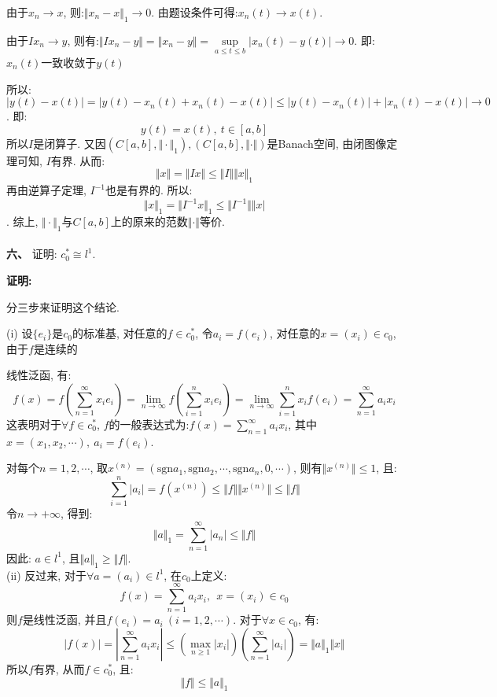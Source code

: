 \documentclass{article}
\begin{document}
由于$x_n \rightarrow x$, 则:$\Vert x_n - x \Vert_1 \rightarrow 0$. 由题设条件可得:$x_n(t) \rightarrow x(t)$. 

由于$Ix_n \rightarrow y$, 则有:$\Vert Ix_n - y \Vert = \Vert x_n - y \Vert = \sup\limits_{a \leq t \leq b} |x_n(t) - y(t)| \rightarrow 0$. 即:$x_n(t)$一致收敛于$y(t)$

所以:$|y(t) - x(t)| = |y(t) - x_n(t) + x_n(t) - x(t)| \leq |y(t) - x_n(t)| + |x_n(t) - x(t)| \rightarrow 0$. 即: 
$$y(t) = x(t), \ t \in [a,b]$$
所以$I$是闭算子. 又因$(C[a,b], \Vert \cdot \Vert_1), (C[a,b], \Vert \cdot \Vert)$是Banach空间, 由闭图像定理可知, $I$有界. 从而:
$$ \Vert x \Vert = \Vert Ix \Vert \leq \Vert I \Vert \Vert x \Vert_1 $$
再由逆算子定理, $I^{-1}$也是有界的. 所以:
$$ \Vert x \Vert_1 = \Vert I^{-1}x \Vert_1 \leq \Vert I^{-1} \Vert \Vert x \vert $$ .
综上, $\Vert \cdot \Vert_1$与$C[a,b]$上的原来的范数$\Vert \cdot \Vert$等价. \\  \\



\textbf{六、} 证明: $c_0^* \cong l^1$.

\textbf{证明:}

分三步来证明这个结论.

(i) 设$\{e_i \}$是$c_0$的标准基, 对任意的$f \in c_0^*$, 令$a_i = f(e_i)$, 对任意的$x=(x_i) \in c_0$, 由于$f$是连续的

\hspace{1.1em} 线性泛函, 有:
$$ f(x) = f(\sum\limits_{n=1}^{\infty} x_ie_i) = \lim\limits_{n \rightarrow \infty} f(\sum\limits_{i=1}^n x_ie_i) = \lim\limits_{n \rightarrow \infty} \sum\limits_{i=1}^n x_if(e_i) = \sum\limits_{n=1}^{\infty}  a_ix_i$$
这表明对于$\forall f \in c_0^*$, $f$的一般表达式为:$f(x) = \sum\limits_{n=1}^{\infty} a_ix_i$, 其中$x = (x_1, x_2, \cdots), \ a_i = f(e_i)$.

对每个$n=1,2,\cdots$, 取$x^{(n)} = (\text{sgn}a_1, \text{sgn}a_2, \cdots, \text{sgn}a_n,0, \cdots)$, 则有$\Vert x^{(n)} \Vert \leq 1$, 且:
$$ \sum\limits_{i=1}^{n} |a_i| =  f(x^{(n)}) \leq \Vert f \Vert \Vert x^{(n)} \Vert \leq \Vert f \Vert  $$
令$n \rightarrow +\infty$, 得到:
$$ \Vert a \Vert_1  = \sum\limits_{n=1}^{\infty} |a_n| \leq \Vert f \Vert $$
因此: $a \in l^1$, 且$\Vert a \Vert_1 \geq \Vert f \Vert $.\\

(ii) 反过来, 对于$\forall a=(a_i) \in l^1$, 在$c_0$上定义:
$$ f(x) = \sum\limits_{n=1}^{\infty} a_i x_i , \ \ x=(x_i) \in c_0$$
则$f$是线性泛函, 并且$f(e_i) = a_i\ (i=1,2,\cdots)$. 对于$\forall x \in c_0$, 有:
$$ |f(x)| = |\sum\limits_{n=1}^{\infty} a_i x_i| \leq (\max\limits_{n \geq 1} |x_i|)(\sum\limits_{n=1}^{\infty}|a_i|) = \Vert a \Vert_1 \Vert x \Vert $$
所以$f$有界, 从而$f \in c_0^*$, 且:
$$ \Vert f \Vert \leq \Vert a \Vert_1 $$ 
\end{document}
